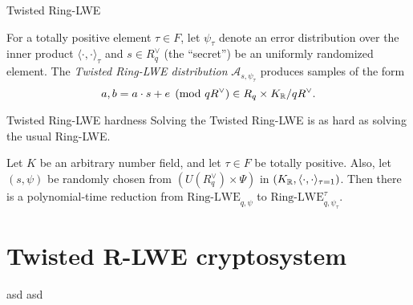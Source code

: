 \documentclass[notheorems, bigger]{beamer}
\begin{document}
\begin{frame}[label={sec:org940e1e7}]{Twisted Ring-LWE}
\begin{text}
  For a totally positive element $\tau \in F$, let $\psi_\tau$ denote an error distribution
  over the inner product $\langle{\cdot,\cdot}\rangle_\tau$ and $s \in R^\vee_q$ (the “secret”) be an
  uniformly randomized element. The \emph{Twisted Ring-LWE distribution}
  $\mathcal{A}_{s,\psi_\tau}$ produces samples of the form
  \[
    a, b = a \cdot s + e \pmod{qR^\vee} \in R_q \times K_{\mathbb{R}}/qR^\vee.
\]
\end{text}
\end{frame}
\begin{frame}[label={sec:orgdbc8289}]{Twisted Ring-LWE hardness}
Solving the Twisted Ring-LWE is as hard as solving the usual Ring-LWE.
\begin{theorem}
  \label{theorem:twisted-ring-lwe-hardness}
  Let $K$ be an arbitrary number field, and let $\tau \in F$ be totally positive.
  Also, let $(s,\psi)$ be randomly chosen from $(U(R_q^\vee)\times \Psi)$ in $(K_{\mathbb{R}},\langle{\cdot,\cdot}\rangle_{\tau=1})$.
  Then there is a polynomial-time reduction from $\mbox{Ring-LWE}_{q,\psi}$ to $\mbox{Ring-LWE}^\tau_{q,\psi_\tau}$.
\end{theorem}
\end{frame}
\section{Twisted R-LWE cryptosystem}
\label{sec:org7560c84}
\begin{frame}[label={sec:org454c63e}]{asd}
asd
\end{frame}
\end{document}
